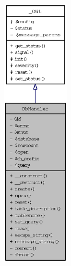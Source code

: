 \begin{figure}[H]
\begin{center}
\leavevmode
\includegraphics[height=400pt]{classDbHandler__coll__graph}
\end{center}
\end{figure}
